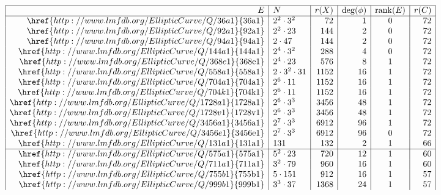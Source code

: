 \documentclass{amsart}
\numberwithin{equation}{section}
\theoremstyle{definition}
\begin{document}
\begin{table}[ht]
	\[
	\begin{array}{|r|l|r|r|c|r|}
		\hline
		E & N & r(X) & \deg(\phi) & \mathrm{rank}(E) & r(C)\\
		\hline
\href{http://www.lmfdb.org/EllipticCurve/Q/36a1}{\mathrm{36a1}} & 2^{2} \cdot 3^{2} & 72 & 1 & 0 & 72 \\
\href{http://www.lmfdb.org/EllipticCurve/Q/92a1}{\mathrm{92a1}} & 2^{2} \cdot 23 & 144 & 2 & 0 & 72 \\
\href{http://www.lmfdb.org/EllipticCurve/Q/94a1}{\mathrm{94a1}} & 2 \cdot 47 & 144 & 2 & 0 & 72 \\
\href{http://www.lmfdb.org/EllipticCurve/Q/144a1}{\mathrm{144a1}} & 2^{4} \cdot 3^{2} & 288 & 4 & 0 & 72 \\
\href{http://www.lmfdb.org/EllipticCurve/Q/368e1}{\mathrm{368e1}} & 2^{4} \cdot 23 & 576 & 8 & 1 & 72 \\
\href{http://www.lmfdb.org/EllipticCurve/Q/558a1}{\mathrm{558a1}} & 2 \cdot 3^{2} \cdot 31 & 1152 & 16 & 1 & 72 \\
\href{http://www.lmfdb.org/EllipticCurve/Q/704a1}{\mathrm{704a1}} & 2^{6} \cdot 11 & 1152 & 16 & 1 & 72 \\
\href{http://www.lmfdb.org/EllipticCurve/Q/704k1}{\mathrm{704k1}} & 2^{6} \cdot 11 & 1152 & 16 & 1 & 72 \\
\href{http://www.lmfdb.org/EllipticCurve/Q/1728a1}{\mathrm{1728a1}} & 2^{6} \cdot 3^{3} & 3456 & 48 & 1 & 72 \\
\href{http://www.lmfdb.org/EllipticCurve/Q/1728v1}{\mathrm{1728v1}} & 2^{6} \cdot 3^{3} & 3456 & 48 & 1 & 72 \\
\href{http://www.lmfdb.org/EllipticCurve/Q/3456a1}{\mathrm{3456a1}} & 2^{7} \cdot 3^{3} & 6912 & 96 & 1 & 72 \\
\href{http://www.lmfdb.org/EllipticCurve/Q/3456e1}{\mathrm{3456e1}} & 2^{7} \cdot 3^{3} & 6912 & 96 & 0 & 72 \\
\href{http://www.lmfdb.org/EllipticCurve/Q/131a1}{\mathrm{131a1}} & 131 & 132 & 2 & 1 & 66 \\
\hline
\href{http://www.lmfdb.org/EllipticCurve/Q/575a1}{\mathrm{575a1}} & 5^{2} \cdot 23 & 720 & 12 & 1 & 60 \\
\href{http://www.lmfdb.org/EllipticCurve/Q/711a1}{\mathrm{711a1}} & 3^{2} \cdot 79 & 960 & 16 & 1 & 60 \\
\href{http://www.lmfdb.org/EllipticCurve/Q/755b1}{\mathrm{755b1}} & 5 \cdot 151 & 912 & 16 & 1 & 57 \\
\href{http://www.lmfdb.org/EllipticCurve/Q/999b1}{\mathrm{999b1}} & 3^{3} \cdot 37 & 1368 & 24 & 1 & 57 \\

\end{array}\]
\end{table}
\end{document}
